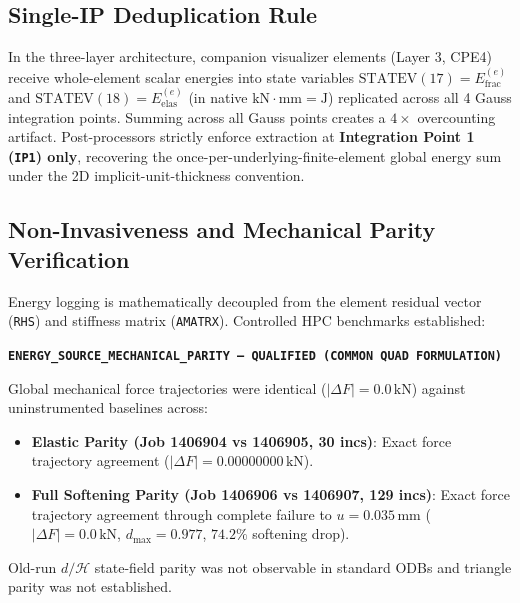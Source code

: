 \subsection{Single-IP Deduplication Rule}
In the three-layer architecture, companion visualizer elements (Layer 3, CPE4) receive whole-element scalar energies into state variables $\mathrm{STATEV}(17) = E_{\mathrm{frac}}^{(e)}$ and $\mathrm{STATEV}(18) = E_{\mathrm{elas}}^{(e)}$ (in native $\mathrm{kN\cdot mm} = \mathrm{J}$) replicated across all 4 Gauss integration points. Summing across all Gauss points creates a $4\times$ overcounting artifact. Post-processors strictly enforce extraction at \textbf{Integration Point 1 (\texttt{IP1}) only}, recovering the once-per-underlying-finite-element global energy sum under the 2D implicit-unit-thickness convention.

\subsection{Non-Invasiveness and Mechanical Parity Verification}
Energy logging is mathematically decoupled from the element residual vector (\texttt{RHS}) and stiffness matrix (\texttt{AMATRX}). Controlled HPC benchmarks established:
\begin{center}
  \textbf{\texttt{ENERGY\_SOURCE\_MECHANICAL\_PARITY --- QUALIFIED (COMMON QUAD FORMULATION)}}
\end{center}
Global mechanical force trajectories were identical ($|\Delta F| = 0.0\,\text{kN}$) against uninstrumented baselines across:
\begin{itemize}
    \item \textbf{Elastic Parity (Job 1406904 vs 1406905, 30 incs)}: Exact force trajectory agreement ($|\Delta F| = 0.00000000\,\text{kN}$).
    \item \textbf{Full Softening Parity (Job 1406906 vs 1406907, 129 incs)}: Exact force trajectory agreement through complete failure to $u = 0.035\,\text{mm}$ ($|\Delta F| = 0.0\,\text{kN}$, $d_{\max} = 0.977$, $74.2\%$ softening drop).
\end{itemize}
Old-run $d/\mathcal{H}$ state-field parity was not observable in standard ODBs and triangle parity was not established.

